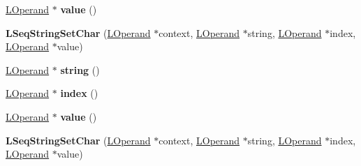 \begin{DoxyCompactItemize}
\item 
\hyperlink{classv8_1_1internal_1_1_l_operand}{L\+Operand} $\ast$ {\bfseries value} ()\hypertarget{classv8_1_1internal_1_1_l_seq_string_set_char_aeb1a6ce9adf8943da9ec22afe2b5af72}{}\label{classv8_1_1internal_1_1_l_seq_string_set_char_aeb1a6ce9adf8943da9ec22afe2b5af72}

\item 
{\bfseries L\+Seq\+String\+Set\+Char} (\hyperlink{classv8_1_1internal_1_1_l_operand}{L\+Operand} $\ast$context, \hyperlink{classv8_1_1internal_1_1_l_operand}{L\+Operand} $\ast$string, \hyperlink{classv8_1_1internal_1_1_l_operand}{L\+Operand} $\ast$index, \hyperlink{classv8_1_1internal_1_1_l_operand}{L\+Operand} $\ast$value)\hypertarget{classv8_1_1internal_1_1_l_seq_string_set_char_a719cac196a8e6c740c4055635b87f496}{}\label{classv8_1_1internal_1_1_l_seq_string_set_char_a719cac196a8e6c740c4055635b87f496}

\item 
\hyperlink{classv8_1_1internal_1_1_l_operand}{L\+Operand} $\ast$ {\bfseries string} ()\hypertarget{classv8_1_1internal_1_1_l_seq_string_set_char_a1fcee06e873470500f85a41f75bd0faa}{}\label{classv8_1_1internal_1_1_l_seq_string_set_char_a1fcee06e873470500f85a41f75bd0faa}

\item 
\hyperlink{classv8_1_1internal_1_1_l_operand}{L\+Operand} $\ast$ {\bfseries index} ()\hypertarget{classv8_1_1internal_1_1_l_seq_string_set_char_ab3e762192555a55b62a9b438635a1178}{}\label{classv8_1_1internal_1_1_l_seq_string_set_char_ab3e762192555a55b62a9b438635a1178}

\item 
\hyperlink{classv8_1_1internal_1_1_l_operand}{L\+Operand} $\ast$ {\bfseries value} ()\hypertarget{classv8_1_1internal_1_1_l_seq_string_set_char_aeb1a6ce9adf8943da9ec22afe2b5af72}{}\label{classv8_1_1internal_1_1_l_seq_string_set_char_aeb1a6ce9adf8943da9ec22afe2b5af72}

\item 
{\bfseries L\+Seq\+String\+Set\+Char} (\hyperlink{classv8_1_1internal_1_1_l_operand}{L\+Operand} $\ast$context, \hyperlink{classv8_1_1internal_1_1_l_operand}{L\+Operand} $\ast$string, \hyperlink{classv8_1_1internal_1_1_l_operand}{L\+Operand} $\ast$index, \hyperlink{classv8_1_1internal_1_1_l_operand}{L\+Operand} $\ast$value)\hypertarget{classv8_1_1internal_1_1_l_seq_string_set_char_a719cac196a8e6c740c4055635b87f496}{}\label{classv8_1_1internal_1_1_l_seq_string_set_char_a719cac196a8e6c740c4055635b87f496}


\end{DoxyCompactItemize}
